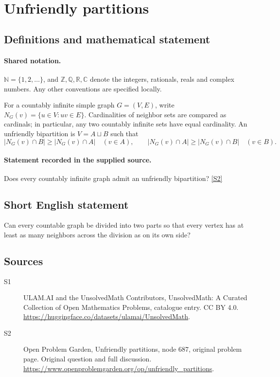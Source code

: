 \documentclass[11pt]{article}
\newcommand{\sref}[2]{\hyperlink{source:#1:#2}{[S#2]}}
\begin{document}
\section{Unfriendly partitions}\label{statement}

\subsection{Definitions and mathematical statement}

\paragraph{Shared notation.}$\mathbb N=\{1,2,\ldots\}$, and $\mathbb Z,\mathbb Q,\mathbb R,\mathbb C$ denote the integers, rationals, reals and complex numbers. Any other conventions are specified locally.


For a countably infinite simple graph $G=(V,E)$, write $N_G(v)=\{u\in V:uv\in E\}$. Cardinalities of neighbor sets are compared as cardinals; in particular, any two countably infinite sets have equal cardinality. An unfriendly bipartition is $V=A\sqcup B$ such that\[ |N_G(v)\cap B|\geq |N_G(v)\cap A|\quad(v\in A),\qquad |N_G(v)\cap A|\geq |N_G(v)\cap B|\quad(v\in B). \]
\paragraph{Statement recorded in the supplied source.}
Does every countably infinite graph admit an unfriendly bipartition? \sref{statement}{2}
\subsection{Short English statement}
Can every countable graph be divided into two parts so that every vertex has at least as many neighbors across the division as on its own side?
\subsection{Sources}
\begin{description}
\item[\hypertarget{source:statement:1}{S1}] ULAM.AI and the UnsolvedMath Contributors, UnsolvedMath: A Curated Collection of Open Mathematics Problems, catalogue entry. CC BY 4.0. \url{https://huggingface.co/datasets/ulamai/UnsolvedMath}.
\item[\hypertarget{source:statement:2}{S2}] Open Problem Garden, Unfriendly partitions, node 687, original problem page. Original question and full discussion. \url{https://www.openproblemgarden.org/op/unfriendly_partitions}.

\end{description}
\label{end:statement}
\end{document}
